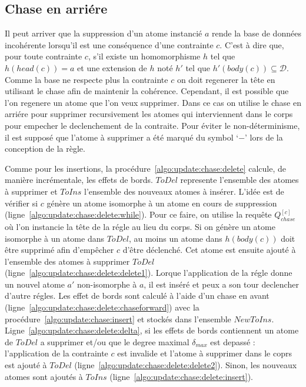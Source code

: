 \subsection{Chase en arriére}
Il peut arriver que la suppression d'un atome instancié $a$ rende la base de données incohérente lorsqu'il est une conséquence d'une contrainte $c$.
C'est à dire que, pour toute contrainte $c$, s'il existe un homomorphisme $h$ tel que $h(head(c)) = a$ et une extension de $h$ noté $h'$ tel que $h'(body(c)) \subseteq \mathcal{D}$.
Comme la base ne respecte plus la contrainte $c$ on doit regenerer la tête en utilisant le \gls{chase} afin de maintenir la cohérence.
Cependant, il est possible que l'on regenere un atome que l'on veux supprimer.
Dans ce cas on utilise le \gls{chase} en arriére pour supprimer recursivement les atomes qui interviennent dans le corps pour empecher le declenchement de la contraite.
Pour éviter le non-déterminisme, il est supposé que l'atome à supprimer a été marqué du symbol `$-$' lors de la conception de la règle.

Comme pour les insertions, la procédure~\ref{algo:update:chase:delete} calcule, de manière incrémentale, les effets de bords.
$ToDel$ represente l'ensemble des atomes à supprimer et $ToIns$ l'ensemble des nouveaux atomes à insérer.
L'idée est de vérifier si $c$ génère un atome isomorphe à un atome en cours de suppression (ligne~\ref{algo:update:chase:delete:while}).
Pour ce faire, on utilise la requête $Q_{chase}^{[c]}$ où l'on instancie la tête de la régle au lieu du corps.
Si on génère un atome isomorphe à un atome dans $ToDel$, au moins un atome dans $h(body(c))$ doit être supprimé afin d'empêcher $c$ d'être déclenché.
Cet atome est ensuite ajouté à l'ensemble des atomes à supprimer $ToDel$ (ligne~\ref{algo:update:chase:delete:delete1}).
Lorque l'application de la régle donne un nouvel atome $a'$ non-isomorphe à $a$, il est inséré et peux a son tour declencher d'autre régles.
Les effet de bords sont calculé à l'aide d'un \gls{chase} en avant (ligne~\ref{algo:update:chase:delete:chaseforward}) avec la procédure~\ref{algo:update:chase:insert} et stockés dans l'ensemble $NewToIns$.
Ligne~\ref{algo:update:chase:delete:delta}, si les effets de bords contiennent un atome de $ToDel$ a supprimer et/ou que le degree maximal $\delta_{max}$ est depassé : l'application de la contrainte $c$ est invalide et l'atome à supprimer dans le coprs est ajouté à $ToDel$ (ligne~\ref{algo:update:chase:delete:delete2}).
Sinon, les nouveaux atomes sont ajoutés à $ToIns$ (ligne~\ref{algo:update:chase:delete:insert}).

